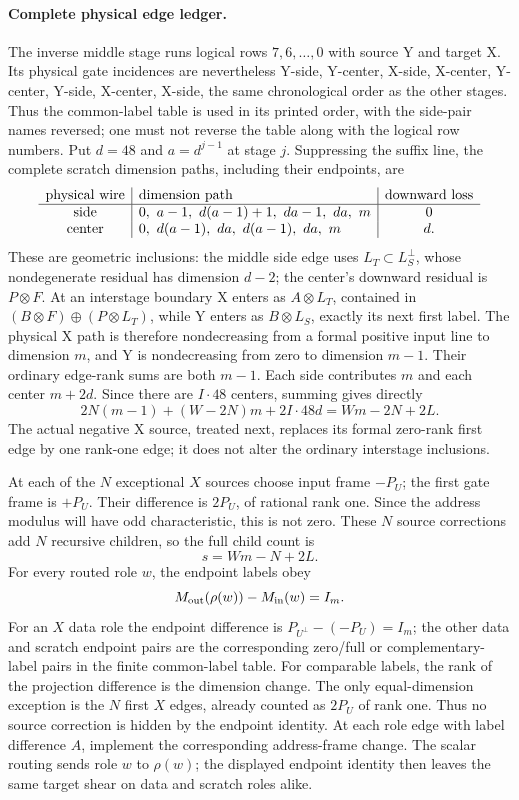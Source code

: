 \paragraph{Complete physical edge ledger.}
The inverse middle stage runs logical rows $7,6,\ldots,0$ with source
Y and target X. Its physical gate incidences are nevertheless
Y-side, Y-center, X-side, X-center, Y-center, Y-side, X-center, X-side,
the same chronological order as the other stages. Thus the common-label
table is used in its printed order, with the side-pair names reversed;
one must not reverse the table along with the logical row numbers.
Put $d=48$ and $a=d^{j-1}$ at stage $j$. Suppressing the suffix line,
the complete scratch dimension paths, including their endpoints, are
\[
\begin{array}{c|l|c}
 \hbox{physical wire}&\hbox{dimension path}&\hbox{downward loss}\\ \hline
 \hbox{side}&0,\ a-1,\ d(a-1)+1,\ da-1,\ da,\ m&0\\
 \hbox{center}&0,\ d(a-1),\ da,\ d(a-1),\ da,\ m&d .
\end{array}
\]
These are geometric inclusions: the middle side edge uses
$L_T\subset L_S^\perp$, whose nondegenerate residual has dimension
$d-2$; the center's downward residual is $P\otimes F$.
At an interstage boundary X enters as $A\otimes L_T$, contained in
$(B\otimes F)\oplus(P\otimes L_T)$, while Y enters as
$B\otimes L_S$, exactly its next first label. The physical X path is
therefore nondecreasing from a formal positive input line to dimension
$m$, and Y is nondecreasing from zero to dimension $m-1$.
Their ordinary edge-rank sums are both $m-1$.
Each side contributes $m$ and each center $m+2d$.
Since there are $I\cdot48$ centers, summing gives directly
\[
 2N(m-1)+(W-2N)m+2I\cdot48d=Wm-2N+2L.
\]
The actual negative X source, treated next, replaces its formal
zero-rank first edge by one rank-one edge; it does not alter the
ordinary interstage inclusions.

At each of the $N$ exceptional $X$ sources choose input frame $-P_U$;
the first gate frame is $+P_U$.  Their difference is
$2P_U$, of rational rank one.  Since the address modulus will have odd
characteristic, this is not zero.  These $N$ source corrections add $N$
recursive children, so the full child count is
\[
                         s=Wm-N+2L.
\]
For every routed role $w$, the endpoint labels obey
\[
                  M_{\rm out}(\rho(w))-M_{\rm in}(w)=I_m.
\]
For an $X$ data role the endpoint difference is
$P_{U^\perp}-(-P_U)=I_m$; the other data and scratch endpoint pairs
are the corresponding zero/full or complementary-label pairs in the
finite common-label table.  For comparable labels, the rank of the
projection difference is the dimension change.  The only equal-dimension
exception is the $N$ first $X$ edges, already counted as $2P_U$ of rank
one.  Thus no source correction is hidden by the endpoint identity.
At each role edge with label difference $A$, implement the corresponding
address-frame change.  The scalar routing sends role $w$ to $\rho(w)$;
the displayed endpoint identity then leaves the same target shear on
data and scratch roles alike.

